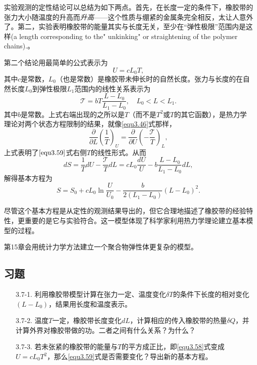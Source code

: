 实验观测的定性结论可以总结为如下两点。首先，在长度一定的条件下，橡胶带的张力大小随温度的升高而{\it 升高}——这个性质与绷紧的金属条完全相反，太让人意外了。第二，实验表明橡胶带的能量其实与长度无关，至少在“弹性极限”范围内是这样{\color{red}(a length corresponding to the" unkinking" or straightening of the polymer chains).}。

第二个结论用最简单的公式表示为
\begin{equation}
    U = cL_0 T,
\label{equ3.58}
\end{equation}
其中$c$是常数，$L_0$（也是常数）是橡胶带未伸长时的自然长度。张力与长度的在自然长度$L_0$到弹性极限$L_1$范围内的线性关系表示为
\begin{equation}
    \mathscr{T} = bT \frac{L - L_0}{L_1 - L_0}, \quad L_0 < L < L_1.
\label{equ3.59}
\end{equation}
其中$b$是常数。上式右端出现的之所以是$T$（而不是$T^2$或$T$的其它函数），是热力学理论对两个状态方程限制的结果，就像\eqref{equ3.46}式那样，
\begin{equation}
    \frac{\partial}{\partial L} \left( \frac{1}{T} \right)_U = \frac{\partial}{\partial U} \left( -\frac{\mathscr{T}}{T} \right)_L,
\label{equ3.60}
\end{equation}
上式表明了$\eqref{equ3.59}$式右侧$T$的线性形式。从而
\begin{equation}
    dS = \frac{1}{T} dU - \frac{\mathscr{T}}{T} dL = cL_0 \frac{dU}{U} - b \frac{L - L_0}{L_1 - L_0} dL,
\label{equ3.61}
\end{equation}
解得基本方程为
\begin{equation}
    S = S_0 + cL_0 \ln \frac{U}{U_0} - \frac{b}{2(L_1 - L_0)} (L - L_0)^2.
\label{equ3.62}
\end{equation}

尽管这个基本方程是从定性的观测结果导出的，但它合理地描述了橡胶带的经验特性，更重要的是它与实验符合。这一模型体现了科学家利用热力学理论建立基本模型的过程。

第15章会用统计力学方法建立一个聚合物弹性体更复杂的模型。

\subsection*{习题}
\begin{enumerate}
    \item[3.7-1.] 利用橡胶带模型计算在张力一定、温度变化$\delta T$的条件下长度的相对变化$(L - L_0)$，结果用长度和温度表示。
    \item[3.7-2.] 温度$T$一定，橡胶带长度变化$dL$，计算相应的传入橡胶带的热量$\delta Q$，并计算外界对橡胶带做的功。二者之间有什么关系？为什么？
    \item[3.7-3.] 若未张紧的橡胶带的能量与$T$的平方成正比，即\eqref{equ3.58}式变成$U = cL_0 T^2$，那么\eqref{equ3.59}式是否需要变化？导出新的基本方程。
\end{enumerate}

